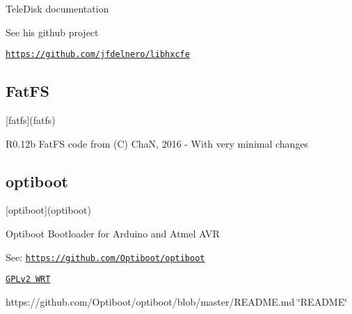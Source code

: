 \begin{DoxyItemize}
\begin{DoxyItemize}
\begin{DoxyItemize}
\begin{DoxyItemize}
\begin{DoxyItemize}
\begin{DoxyItemize}
\item Tele\+Disk documentation
\end{DoxyItemize}
\item See his github project
\begin{DoxyItemize}
\item \href{https://github.com/jfdelnero/libhxcfe}{\tt https\+://github.\+com/jfdelnero/libhxcfe}
\end{DoxyItemize}
\end{DoxyItemize}
\end{DoxyItemize}
\end{DoxyItemize}
\end{DoxyItemize}
\end{DoxyItemize}

\subsection*{Fat\+FS}


\begin{DoxyItemize}
\item \mbox{[}fatfs\mbox{]}(fatfs)
\begin{DoxyItemize}
\item R0.\+12b Fat\+FS code from (C) ChaN, 2016 -\/ With very minimal changes
\end{DoxyItemize}
\end{DoxyItemize}

\subsection*{optiboot}


\begin{DoxyItemize}
\item \mbox{[}optiboot\mbox{]}(optiboot)
\begin{DoxyItemize}
\item Optiboot Bootloader for Arduino and Atmel A\+VR
\item See\+: \href{https://github.com/Optiboot/optiboot}{\tt https\+://github.\+com/\+Optiboot/optiboot}
\begin{DoxyItemize}
\item \href{https://github.com/Optiboot/optiboot/blob/master/LICENSE}{\tt G\+P\+Lv2 W\+RT}
\item https\+://github.com/\+Optiboot/optiboot/blob/master/\+R\+E\+A\+D\+M\+E.\+md \char`\"{}\+R\+E\+A\+D\+M\+E\char`\"{}
\end{DoxyItemize}
\end{DoxyItemize}
\end{DoxyItemize}





